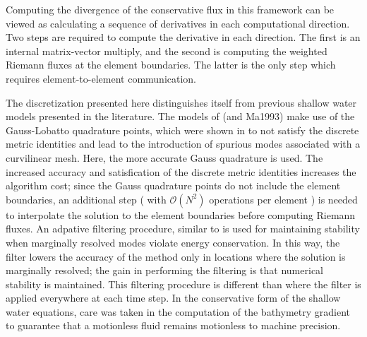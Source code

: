 \documentclass{softwaremanual}
\begin{document}
 Computing the divergence of the conservative flux in this framework can be viewed as calculating a sequence of derivatives in each computational direction. Two steps are required to compute the derivative in each direction. The first is an internal matrix-vector multiply, and the second is computing the weighted Riemann fluxes at the element boundaries. The latter is the only step which requires element-to-element communication.

The discretization presented here distinguishes itself from previous shallow water models presented in the literature. The models of \citet{Iskandarani1995} (and Ma1993) make use of the Gauss-Lobatto quadrature points, which were shown in \citet{Kopriva2006} to not satisfy the discrete metric identities and lead to the introduction of spurious modes associated with a curvilinear mesh. Here, the more accurate Gauss quadrature is used. The increased accuracy and satisfication of the discrete metric identities increases the algorithm cost; since the Gauss quadrature points do not include the element boundaries, an additional step ( with $\mathcal{O}(N^2)$ operations per element ) is needed to interpolate the solution to the element boundaries before computing Riemann fluxes. An adpative filtering procedure, similar to \citet{Flad2016} is used for maintaining stability when marginally resolved modes violate energy conservation. In this way, the filter lowers the accuracy of the method only in locations where the solution is marginally resolved; the gain in performing the filtering is that numerical stability is maintained. This filtering procedure is different than \citet{Taylor1997} where the filter is applied everywhere at each time step. In the conservative form of the shallow water equations, care was taken in the computation of the bathymetry gradient to guarantee that a motionless fluid remains motionless to machine precision.

\pagebreak



\end{document}

